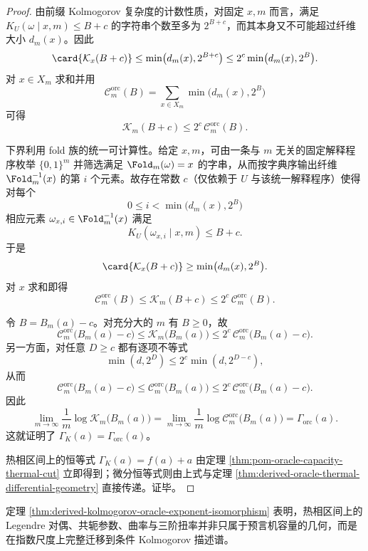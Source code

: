 \begin{proof}
由前缀 Kolmogorov 复杂度的计数性质，对固定 \(x,m\) 而言，满足
\(
K_U(\omega\mid x,m)\le B+c
\)
的字符串个数至多为 \(2^{B+c}\)，而其本身又不可能超过纤维大小 \(d_m(x)\)。因此
\[
\card{\mathcal K_x(B+c)}
\le
\min\bigl(d_m(x),2^{B+c}\bigr)
\le
2^c\min\bigl(d_m(x),2^B\bigr).
\]
对 \(x\in X_m\) 求和并用
\[
\mathcal{C}^{\mathrm{orc}}_m(B)=\sum_{x\in X_m}\min\bigl(d_m(x),2^B\bigr)
\]
可得
\[
\mathcal K_m(B+c)\le 2^c\,\mathcal{C}^{\mathrm{orc}}_m(B).
\]

下界利用 fold 族的统一可计算性。给定 \(x,m\)，可由一条与 \(m\) 无关的固定解释程序枚举 \(\{0,1\}^m\) 并筛选满足 \(\Fold_m(\omega)=x\) 的字串，从而按字典序输出纤维 \(\Fold_m^{-1}(x)\) 的第 \(i\) 个元素。故存在常数 \(c\)（仅依赖于 \(U\) 与该统一解释程序）使得对每个
\[
0\le i<\min\bigl(d_m(x),2^B\bigr)
\]
相应元素 \(\omega_{x,i}\in\Fold_m^{-1}(x)\) 满足
\[
K_U(\omega_{x,i}\mid x,m)\le B+c.
\]
于是
\[
\card{\mathcal K_x(B+c)}\ge \min\bigl(d_m(x),2^B\bigr).
\]
对 \(x\) 求和即得
\[
\mathcal{C}^{\mathrm{orc}}_m(B)\le \mathcal K_m(B+c)\le 2^c\,\mathcal{C}^{\mathrm{orc}}_m(B).
\]

令 \(B=B_m(a)-c\)。对充分大的 \(m\) 有 \(B\ge 0\)，故
\[
\mathcal{C}^{\mathrm{orc}}_m\bigl(B_m(a)-c\bigr)
\le
\mathcal K_m\bigl(B_m(a)\bigr)
\le
2^c\,\mathcal{C}^{\mathrm{orc}}_m\bigl(B_m(a)-c\bigr).
\]
另一方面，对任意 \(D\ge c\) 都有逐项不等式
\[
\min(d,2^D)\le 2^c\min(d,2^{D-c}),
\]
从而
\[
\mathcal{C}^{\mathrm{orc}}_m\bigl(B_m(a)-c\bigr)
\le
\mathcal{C}^{\mathrm{orc}}_m\bigl(B_m(a)\bigr)
\le
2^c\,\mathcal{C}^{\mathrm{orc}}_m\bigl(B_m(a)-c\bigr).
\]
因此
\[
\lim_{m\to\infty}\frac1m\log \mathcal K_m\bigl(B_m(a)\bigr)
=
\lim_{m\to\infty}\frac1m\log \mathcal{C}^{\mathrm{orc}}_m\bigl(B_m(a)\bigr)
=
\Gamma_{\mathrm{orc}}(a).
\]
这就证明了 \(\Gamma_K(a)=\Gamma_{\mathrm{orc}}(a)\)。

热相区间上的恒等式 \(\Gamma_K(a)=f(a)+a\) 由定理 \ref{thm:pom-oracle-capacity-thermal-cut} 立即得到；微分恒等式则由上式与定理 \ref{thm:derived-oracle-thermal-differential-geometry} 直接传递。证毕。
\end{proof}

\begin{remark}[热相几何向条件描述谱的迁移]\label{rem:derived-kolmogorov-oracle-geometry-transfer}
定理 \ref{thm:derived-kolmogorov-oracle-exponent-isomorphism} 表明，热相区间上的 Legendre 对偶、共轭参数、曲率与三阶扭率并非只属于预言机容量的几何，而是在指数尺度上完整迁移到条件 Kolmogorov 描述谱。
\end{remark}

